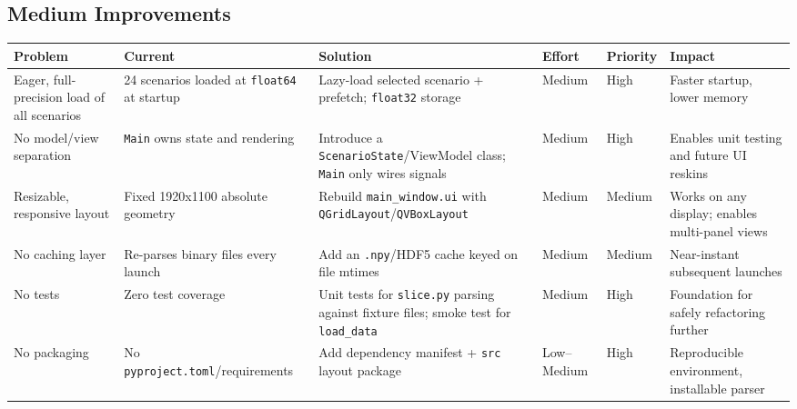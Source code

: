 \documentclass[11pt,a4paper]{report}
\begin{document}
\begin{landscape}
\section{Medium Improvements}
\begin{longtable}{p{2.6cm}p{3.4cm}p{3.4cm}p{1.4cm}p{1.2cm}p{2.6cm}}
\toprule
\textbf{Problem} & \textbf{Current} & \textbf{Solution} & \textbf{Effort} & \textbf{Priority} & \textbf{Impact} \\
\midrule
Eager, full-precision load of all scenarios & 24 scenarios loaded at \texttt{float64} at startup & Lazy-load selected scenario + prefetch; \texttt{float32} storage & Medium & High & Faster startup, lower memory \\
No model/view separation & \texttt{Main} owns state and rendering & Introduce a \texttt{ScenarioState}/ViewModel class; \texttt{Main} only wires signals & Medium & High & Enables unit testing and future UI reskins \\
Resizable, responsive layout & Fixed 1920x1100 absolute geometry & Rebuild \texttt{main\_window.ui} with \texttt{QGridLayout}/\texttt{QVBoxLayout} & Medium & Medium & Works on any display; enables multi-panel views \\
No caching layer & Re-parses binary files every launch & Add an \texttt{.npy}/HDF5 cache keyed on file mtimes & Medium & Medium & Near-instant subsequent launches \\
No tests & Zero test coverage & Unit tests for \texttt{slice.py} parsing against fixture files; smoke test for \texttt{load\_data} & Medium & High & Foundation for safely refactoring further \\
No packaging & No \texttt{pyproject.toml}/requirements & Add dependency manifest + \texttt{src} layout package & Low--Medium & High & Reproducible environment, installable parser \\
\bottomrule
\end{longtable}


\end{landscape}
\end{document}
